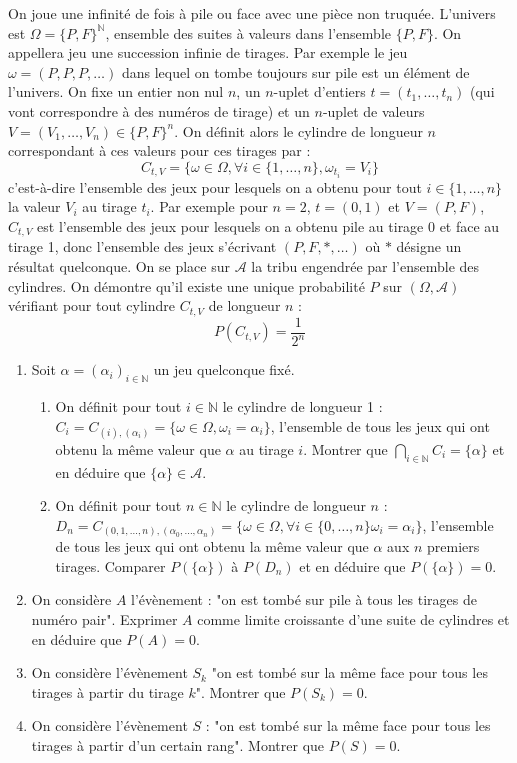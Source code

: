 \begin{exercice}
On joue une infinité de fois à pile ou face avec une pièce non truquée. L'univers est $\Omega = \{P,F\}^{\mathbb{N}}$, ensemble des suites à valeurs dans l'ensemble $\{P, F\}$.
On appellera jeu une succession infinie de tirages. Par exemple le jeu $\omega=(P,P,P,\dots)$ dans lequel on tombe toujours sur pile est un élément de l'univers.
On fixe un entier non nul $n$, un $n$-uplet d'entiers $t=(t_{1},\dots,t_{n})$ (qui vont correspondre à des numéros de tirage) et un $n$-uplet de valeurs $V=(V_{1},\dots,V_{n})\in\{P,F\}^{n}$.
On définit alors le cylindre de longueur $n$ correspondant à ces valeurs pour ces tirages par :
$$ C_{t,V} = \{\omega \in \Omega, \forall i\in\{1,\dots,n\}, \omega_{t_{i}}=V_{i}\} $$
c'est-à-dire l'ensemble des jeux pour lesquels on a obtenu pour tout $i\in\{1,\dots,n\}$ la valeur $V_{i}$ au tirage $t_{i}$.
Par exemple pour $n=2$, $t=(0,1)$ et $V=(P,F)$, $C_{t,V}$ est l'ensemble des jeux pour lesquels on a obtenu pile au tirage 0 et face au tirage 1, donc l'ensemble des jeux s'écrivant $(P,F,*,\dots)$ où $*$ désigne un résultat quelconque.
On se place sur $\mathcal{A}$ la tribu engendrée par l'ensemble des cylindres. On démontre qu'il existe une unique probabilité $P$ sur $(\Omega, \mathcal{A})$ vérifiant pour tout cylindre $C_{t,V}$ de longueur $n$ :
$$ P(C_{t,V})=\frac{1}{2^{n}} $$
\begin{enumerate}
    \item Soit $\alpha=(\alpha_{i})_{i\in\mathbb{N}}$ un jeu quelconque fixé.
    \begin{enumerate}
        \item On définit pour tout $i\in\mathbb{N}$ le cylindre de longueur 1 : $C_{i}=C_{(i),(\alpha_{i})}=\{\omega\in\Omega,\omega_{i}=\alpha_{i}\}$, l'ensemble de tous les jeux qui ont obtenu la même valeur que $\alpha$ au tirage $i$. Montrer que $\bigcap_{i\in\mathbb{N}}C_{i}=\{\alpha\}$ et en déduire que $\{\alpha\}\in\mathcal{A}$.
        \item On définit pour tout $n\in\mathbb{N}$ le cylindre de longueur $n$ : $D_{n}=C_{(0,1,\dots,n),(\alpha_{0},\dots,\alpha_{n})}=\{\omega\in\Omega,\forall i\in\{0,\dots,n\}\omega_{i}=\alpha_{i}\}$, l'ensemble de tous les jeux qui ont obtenu la même valeur que $\alpha$ aux $n$ premiers tirages. Comparer $P(\{\alpha\})$ à $P(D_{n})$ et en déduire que $P(\{\alpha\})=0$.
    \end{enumerate}
    \item On considère $A$ l'évènement : "on est tombé sur pile à tous les tirages de numéro pair". Exprimer $A$ comme limite croissante d'une suite de cylindres et en déduire que $P(A)=0$.
    \item On considère l'évènement $S_k$ "on est tombé sur la même face pour tous les tirages à partir du tirage $k$". Montrer que $P(S_{k})=0$.
    \item On considère l'évènement $S$ : "on est tombé sur la même face pour tous les tirages à partir d'un certain rang". Montrer que $P(S)=0$.
\end{enumerate}
\end{exercice}

